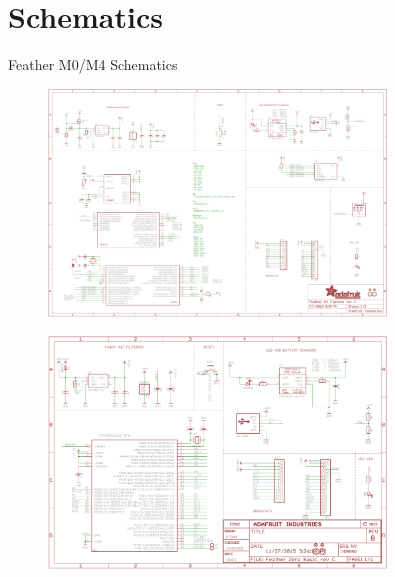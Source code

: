 \documentclass[UKenglish]{beamer}
\begin{document}
\section{Schematics}

\begin{frame}[allowframebreaks]{Feather M0/M4 Schematics}
\begin{figure}[H]
	\centering
	\includegraphics[width=0.8\textwidth]{images/adafruit_featherm4_schematic}
	\label{fig:schematic-featherm4}
\end{figure}
\begin{figure}[H]
	\centering
	\includegraphics[width=0.8\textwidth]{images/adafruit_featherm0_schematic}
	\label{fig:schematic-featherm0}
\end{figure}
\end{frame}
\end{document}
